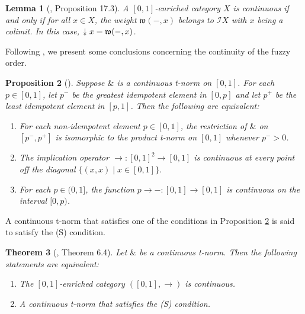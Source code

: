 \documentclass[preprint,3p,times]{elsarticle}
\theoremstyle{plain}
\newtheorem{thm}{Theorem}[section]
\newtheorem{lem}[thm]{Lemma}
\newtheorem{prop}[thm]{Proposition}
\theoremstyle{definition}
\newcommand{\twoheaddownarrow}{\mathrel{\rotatebox[origin=c]{-90}{$\twoheadrightarrow$}}}
\numberwithin{equation}{section}
\begin{document}
\begin{lem}[\cite{Zhang2024IntroductoryNO}, Proposition 17.3]\label{way-below}
	 A \([0,1]\)-enriched category \( X \) is continuous if and only if for all \( x \in X \), the weight \( \mathfrak{w}(-, x) \) belongs to \( \mathcal{I}X \) with \( x \) being a colimit. In this case, \( \twoheaddownarrow x = \mathfrak{w}(-, x) \).
\end{lem}
 Following  \cite{Lai2019CompletelyDE}, we present some conclusions concerning the continuity of the fuzzy order.
 \begin{prop}[\cite{Lai2019CompletelyDE}]\label{implication operator is continuous at every point}
 	Suppose $\mathbin{\&}$ is a continuous t-norm on $[0,1]$. For each $p \in [0,1]$,
 	let $p^-$ be the greatest idempotent element in $[0,p]$ and let $p^+$ be the least idempotent
 	element in $[p,1]$. Then the following are equivalent:
 	
 	\begin{enumerate}[label={\rm(\arabic*)}]
 		\item For each non-idempotent element $p \in [0,1]$, the restriction of $\mathbin{\&}$ on $[p^-,p^+]$
 		is isomorphic to the product t-norm on \([0,1]\) whenever $p^- > 0$.
 		
 		\item The implication operator \(\to: [0,1]^2 \to [0,1]\) is continuous at every point
 		off the diagonal $\{(x,x) \mid x \in [0,1]\}$.
 		
 		\item For each $p \in (0,1]$, the function $p \to -: [0,1] \to [0,1]$ is continuous on the interval $[0,p)$.
 	\end{enumerate}
 \end{prop}
 A continuous t-norm that satisfies one of the conditions in Proposition  \ref{implication operator is continuous at every point} is said to satisfy the (S) condition.
\begin{thm}[\cite{Lai2019CompletelyDE}, Theorem 6.4]\label{continuous= (S) condition}
	Let $\mathbin{\&}$ be a continuous t-norm. Then the following
	statements are equivalent:
	\begin{enumerate}[label={\rm(\arabic*)}]
	
		\item The $[0,1]$-enriched category $([0,1], \rightarrow)$ is continuous.
		\item A continuous t-norm that satisfies the (S) condition.
	\end{enumerate}
\end{thm}
\end{document}
